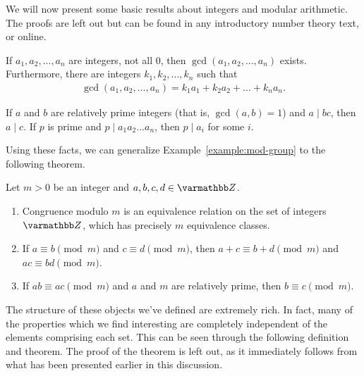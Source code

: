     We will now present some basic results about integers and modular arithmetic. The proofs are left out but can be found in any introductory number theory text, or online.

    \begin{theorem}
        If $a_1,a_2,...,a_n$ are integers, not all 0, then $\gcd(a_1,a_2,...,a_n)$ exists. Furthermore, there are integers $k_1,k_2,...,k_n$ such that
            \begin{equation*}
            \begin{split}
                \gcd(a_1,a_2,...,a_n) = k_1 a_1 + k_2 a_2 + ... + k_n a_n.
            \end{split}
            \end{equation*}
    \end{theorem}

    \begin{theorem}
        If $a$ and $b$ are relatively prime integers (that is, $\gcd(a,b) = 1$) and $a \mid bc$, then $a \mid c$. If $p$ is prime and $p \mid a_1 a_2 ... a_n$, then $p \mid a_i$ for some $i$.
    \end{theorem}

    Using these facts, we can generalize Example~\ref{example:mod-group} to the following theorem.

    \begin{theorem}
        Let $m>0$ be an integer and $a,b,c,d \in \bfZ$.
        \begin{enumerate}[label = (\roman*),itemsep=1pt,topsep=3pt]
            \item Congruence modulo $m$ is an equivalence relation on the set of integers $\bfZ$, which has precisely $m$ equivalence classes.
            \item If $a \equiv b \pmod{m}$ and $c \equiv d \pmod{m}$, then $a+c \equiv b + d \pmod{m}$ and $ac \equiv bd \pmod{m}$.
            \item If $ab \equiv ac \pmod{m}$ and $a$ and $m$ are relatively prime, then $b \equiv c \pmod{m}$.
        \end{enumerate}
    \end{theorem}

    The structure of these objects we've defined are extremely rich. In fact, many of the properties which we find interesting are completely independent of the elements comprising each set. This can be seen through the following definition and theorem. The proof of the theorem is left out, as it immediately follows from what has been presented earlier in this discussion.

